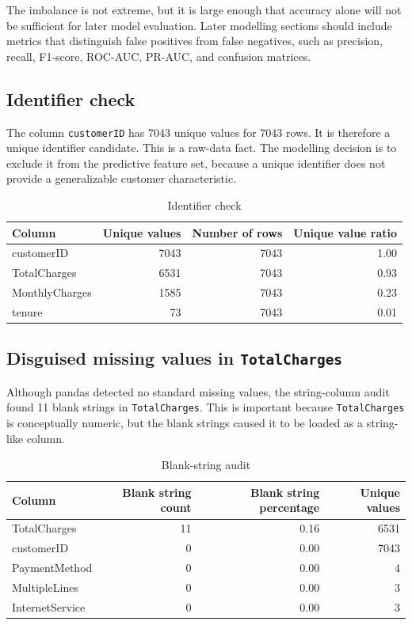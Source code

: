 The imbalance is not extreme, but it is large enough that accuracy alone will not be sufficient for later model evaluation. Later modelling sections should include metrics that distinguish false positives from false negatives, such as precision, recall, F1-score, ROC-AUC, PR-AUC, and confusion matrices.

\subsection{Identifier check}

The column \texttt{customerID} has 7043 unique values for 7043 rows. It is therefore a unique identifier candidate. This is a raw-data fact. The modelling decision is to exclude it from the predictive feature set, because a unique identifier does not provide a generalizable customer characteristic.

\begin{table}[H]
\centering
\caption{Identifier check}
\begin{tabular}{lrrr}
\toprule
Column & Unique values & Number of rows & Unique value ratio \\
\midrule
customerID & 7043 & 7043 & 1.00 \\
TotalCharges & 6531 & 7043 & 0.93 \\
MonthlyCharges & 1585 & 7043 & 0.23 \\
tenure & 73 & 7043 & 0.01 \\
\bottomrule
\end{tabular}
\end{table}

\subsection{Disguised missing values in \texttt{TotalCharges}}

Although pandas detected no standard missing values, the string-column audit found 11 blank strings in \texttt{TotalCharges}. This is important because \texttt{TotalCharges} is conceptually numeric, but the blank strings caused it to be loaded as a string-like column.

\begin{table}[H]
\centering
\caption{Blank-string audit}
\begin{tabular}{lrrr}
\toprule
Column & Blank string count & Blank string percentage & Unique values \\
\midrule
TotalCharges & 11 & 0.16 & 6531 \\
customerID & 0 & 0.00 & 7043 \\
PaymentMethod & 0 & 0.00 & 4 \\
MultipleLines & 0 & 0.00 & 3 \\
InternetService & 0 & 0.00 & 3 \\
\bottomrule
\end{tabular}
\end{table}

